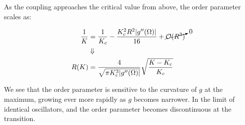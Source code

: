 As the coupling approaches the critical value from above, the order parameter scales as:

\begin{align}
    \frac{1}{K} &= \frac{1}{K_c} - \frac{K_c^2 R^2|g''(\Omega)| }{16} + \cancelto{0}{\mathcal{O}(R^3)} \notag\\
                  &\Downarrow \notag \\
    R(K) &= \frac{4}{\sqrt{\pi K_c^3|g''(\Omega)|}} \sqrt{\frac{K - K_c}{K_c}}
\end{align}

We see that the order parameter is sensitive to the curvature of $g$ at the maximum, growing ever more rapidly as $g$ becomes narrower.
In the limit of identical oscillators, and the order parameter becomes discontinuous at the transition.

